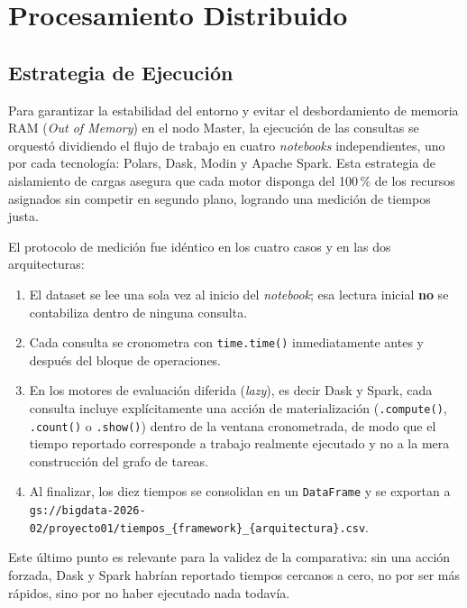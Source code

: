 \section{Procesamiento Distribuido}

\subsection{Estrategia de Ejecución}
Para garantizar la estabilidad del entorno y evitar el desbordamiento de memoria RAM (\textit{Out of Memory}) en el nodo Master, la ejecución de las consultas se orquestó dividiendo el flujo de trabajo en cuatro \textit{notebooks} independientes, uno por cada tecnología: Polars, Dask, Modin y Apache Spark. Esta estrategia de aislamiento de cargas asegura que cada motor disponga del 100\,\% de los recursos asignados sin competir en segundo plano, logrando una medición de tiempos justa.

El protocolo de medición fue idéntico en los cuatro casos y en las dos arquitecturas:

\begin{enumerate}[leftmargin=*]
    \item El dataset se lee una sola vez al inicio del \textit{notebook}; esa lectura inicial \textbf{no} se contabiliza dentro de ninguna consulta.
    \item Cada consulta se cronometra con \texttt{time.time()} inmediatamente antes y después del bloque de operaciones.
    \item En los motores de evaluación diferida (\textit{lazy}), es decir Dask y Spark, cada consulta incluye explícitamente una acción de materialización (\texttt{.compute()}, \texttt{.count()} o \texttt{.show()}) dentro de la ventana cronometrada, de modo que el tiempo reportado corresponde a trabajo realmente ejecutado y no a la mera construcción del grafo de tareas.
    \item Al finalizar, los diez tiempos se consolidan en un \texttt{DataFrame} y se exportan a \texttt{gs:/\bk{}/\bk{}bigdata-\bk{}2026-\bk{}02/\bk{}proyecto01/\bk{}tiempos\_\bk{}\{framework\}\_\{arquitectura\}.csv}.
\end{enumerate}

Este último punto es relevante para la validez de la comparativa: sin una acción forzada, Dask y Spark habrían reportado tiempos cercanos a cero, no por ser más rápidos, sino por no haber ejecutado nada todavía.

